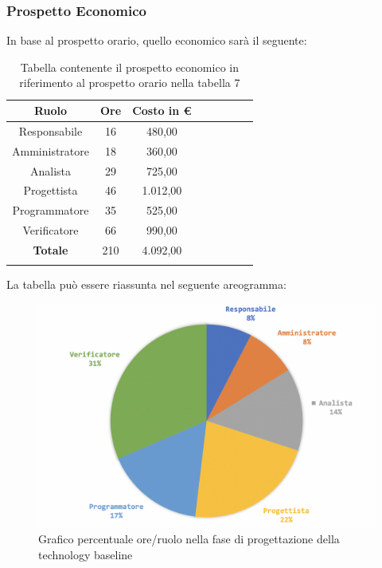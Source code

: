 		\subsubsection{Prospetto Economico}
		In base al prospetto orario, quello economico sarà il seguente: 
		
		\begin{longtable}{|c|c|c|c|c|c|c|c|}
			\hline
			\rowcolor{lighter-grayer}
			\textbf{Ruolo} & \textbf{Ore} & \textbf{Costo in € } \\
			\hline
			\endfirsthead
			
			\hline
			Responsabile 	    & 16 & 480,00\\
			\hline 
			\hline
			Amministratore	  & 18 & 360,00\\
			\hline
			\hline
			Analista 				& 29 & 725,00\\
			\hline
			\hline
			Progettista 		  & 46 & 1.012,00\\
			\hline
			\hline
			Programmatore 	 & 35 & 525,00\\
			\hline
			\hline
			Verificatore 		  & 66 & 990,00\\
			\hline
			\textbf{Totale} 	& 210 & 4.092,00\\
			\hline
			\caption{Tabella contenente il prospetto economico in riferimento al prospetto orario nella tabella 7}
		\end{longtable}
		\pagebreak
		
		La tabella può essere riassunta nel seguente areogramma:
		\begin{figure}[H]
			\centering
			\includegraphics[width=0.8\linewidth]{./images/progArch2.png}
			\caption{Grafico percentuale ore/ruolo nella fase di progettazione della technology baseline}
			\label{fig:grafico costi ruolo fase progettazione della technology baseline}
		\end{figure}
	
